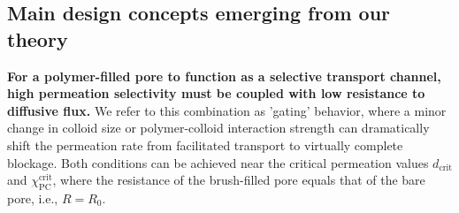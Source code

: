 \documentclass[12pt, a4paper]{article}
\begin{document}



\subsection{Main design concepts emerging from our theory}

\textbf{For a polymer-filled pore to function as a selective transport channel, high permeation selectivity must be coupled with low resistance to diffusive flux.}
We refer to this combination as 'gating' behavior, where a minor change in colloid size or polymer-colloid interaction strength can dramatically shift the permeation rate from facilitated transport to virtually complete blockage.
Both conditions can be achieved near the critical permeation values $d_{\text{crit}}$ and $\chi_{\text{PC}}^{\text{crit}}$, where the resistance of the brush-filled pore equals that of the bare pore, i.e., $R = R_{0}$.
\end{document}
